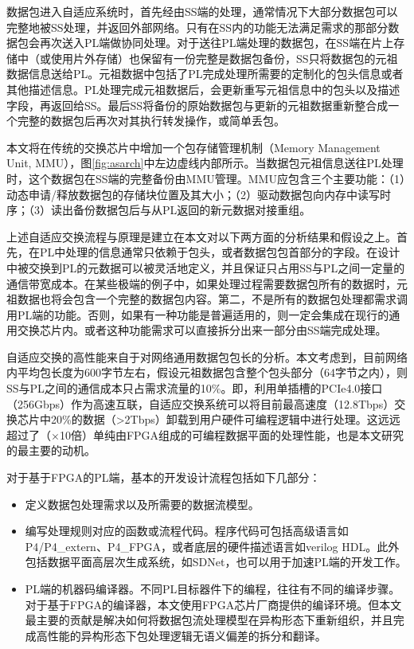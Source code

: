 数据包进入自适应系统时，首先经由SS端的处理，通常情况下大部分数据包可以完整地被SS处理，并返回外部网络。只有在SS内的功能无法满足需求的那部分数据包会再次送入PL端做协同处理。对于送往PL端处理的数据包，在SS端在片上存储中（或使用片外存储）也保留有一份完整是数据包备份，SS只将数据包的元祖数据信息送给PL。元祖数据中包括了PL完成处理所需要的定制化的包头信息或者其他描述信息。PL处理完成元祖数据后，会更新重写元祖信息中的包头以及描述字段，再返回给SS。最后SS将备份的原始数据包与更新的元祖数据重新整合成一个完整的数据包后再次对其执行转发操作，或简单丢包。

本文将在传统的交换芯片中增加一个包存储管理机制（Memory Management Unit, MMU），图\ref{fig:asarch}中左边虚线内部所示。当数据包元祖信息送往PL处理时，这个数据包在SS端的完整备份由MMU管理。MMU应包含三个主要功能：（1）动态申请/释放数据包的存储块位置及其大小；（2）驱动数据包向内存中读写时序；（3）读出备份数据包后与从PL返回的新元数据对接重组。

上述自适应交换流程与原理是建立在本文对以下两方面的分析结果和假设之上。首先，在PL中处理的信息通常只依赖于包头，或者数据包包首部分的字段。在设计中被交换到PL的元数据可以被灵活地定义，并且保证只占用SS与PL之间一定量的通信带宽成本。在某些极端的例子中，如果处理过程需要数据包所有的数据时，元祖数据也将会包含一个完整的数据包内容。第二，不是所有的数据包处理都需求调用PL端的功能。否则，如果有一种功能是普遍适用的，则一定会集成在现行的通用交换芯片内。或者这种功能需求可以直接拆分出来一部分由SS端完成处理。

自适应交换的高性能来自于对网络通用数据包包长的分析。本文考虑到，目前网络内平均包长度为600字节左右，假设元祖数据包含整个包头部分（64字节之内），则SS与PL之间的通信成本只占需求流量的10\%。即，利用单插槽的PCIe4.0接口（256Gbps）作为高速互联，自适应交换系统可以将目前最高速度（12.8Tbps）交换芯片中20\%的数据（>2Tbps）卸载到用户硬件可编程逻辑中进行处理。这远远超过了（$\times$10倍）单纯由FPGA组成的可编程数据平面的处理性能，也是本文研究的最主要的动机。


对于基于FPGA的PL端，基本的开发设计流程包括如下几部分：

\begin{itemize}
	\item 定义数据包处理需求以及所需要的数据流模型。
	\item 编写处理规则对应的函数或流程代码。程序代码可包括高级语言如P4/P4\_extern、P4\_FPGA，或者底层的硬件描述语言如verilog HDL。此外包括数据平面高层次生成系统，如SDNet，也可以用于加速PL端的开发工作。
	\item PL端的机器码编译器。不同PL目标器件下的编程，往往有不同的编译步骤。对于基于FPGA的编译器，本文使用FPGA芯片厂商提供的编译环境。但本文最主要的贡献是解决如何将数据包流处理模型在异构形态下重新组织，并且完成高性能的异构形态下包处理逻辑无语义偏差的拆分和翻译。
\end{itemize}

